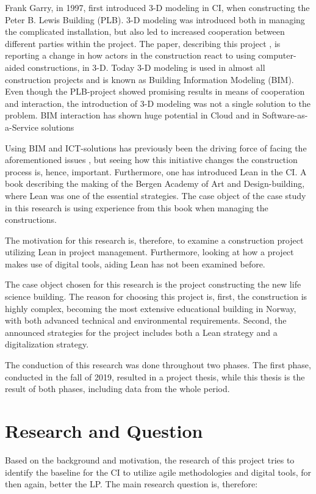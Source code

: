 Frank Garry, in 1997, first introduced 3-D modeling in CI, when constructing the Peter B. Lewis Building (PLB). 3-D modeling was introduced both in managing the complicated installation, but also led to increased cooperation between different parties within the project. The paper, describing this project \citep{frank_gehry}, is reporting a change in how actors in the construction react to using computer-aided constructions, in 3-D. Today 3-D modeling is used in almost all construction projects and is known as Building Information Modeling (BIM). Even though the PLB-project showed promising results in means of cooperation and interaction, the introduction of 3-D modeling was not a single solution to the problem. BIM interaction has shown huge potential in Cloud and in Software-as-a-Service solutions \citep{das2014bimcloud}
 
Using BIM and ICT-solutions has previously been the driving force of facing the aforementioned issues \citep{arayici2010building}, but seeing how this initiative changes the construction process is, hence, important. Furthermore, one has introduced Lean in the CI. A book \citep{lean_i_praksis} describing the making of the Bergen Academy of Art and Design-building, where Lean was one of the essential strategies. The case object of the case study in this research is using experience from this book when managing the constructions. 
 
The motivation for this research is, therefore, to examine a construction project utilizing Lean in project management. Furthermore, looking at how a project makes use of digital tools, aiding Lean has not been examined before. 
 
The case object chosen for this research is the project constructing the new life science building. The reason for choosing this project is, first, the construction is highly complex, becoming the most extensive educational building in Norway, with both advanced technical and environmental requirements. Second, the announced strategies for the project includes both a Lean strategy and a digitalization strategy. 

The conduction of this research was done throughout two phases. The first phase, conducted in the fall of 2019, resulted in a project thesis, while this thesis is the result of both phases, including data from the whole period.

\section{Research and Question} \label{sec:research}
Based on the background and motivation, the research of this project tries to identify the baseline for the CI to utilize agile methodologies and digital tools, for then again, better the LP. The main research question is, therefore:

